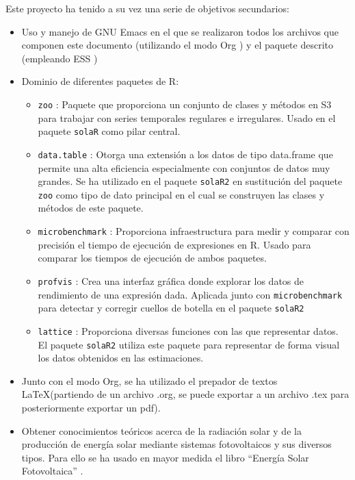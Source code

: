 Este proyecto ha tenido a su vez una serie de objetivos secundarios:
\begin{itemize}
\item Uso y manejo de GNU Emacs \cite{emacs85} en el que se realizaron todos los archivos que componen este documento (utilizando el modo Org \cite{dominik03}) y el paquete descrito (empleando ESS \cite{ess24})
\item Dominio de diferentes paquetes de R:
\begin{itemize}
\item \texttt{zoo} \cite{zeileis05}: Paquete que proporciona un conjunto de clases y métodos en S3 para trabajar con series temporales regulares e irregulares.
Usado en el paquete \texttt{solaR} como pilar central.
\item \texttt{data.table} \cite{barrett24}: Otorga una extensión a los datos de tipo data.frame que permite una alta eficiencia especialmente con conjuntos de datos muy grandes.
Se ha utilizado en el paquete \texttt{solaR2} en sustitución del paquete \texttt{zoo} como tipo de dato principal en el cual se construyen las clases y métodos de este paquete.
\item \texttt{microbenchmark} \cite{mersmann23}: Proporciona infraestructura para medir y comparar con precisión el tiempo de ejecución de expresiones en R.
Usado para comparar los tiempos de ejecución de ambos paquetes.
\item \texttt{profvis} \cite{wickham24}: Crea una interfaz gráfica donde explorar los datos de rendimiento de una expresión dada.
Aplicada junto con \texttt{microbenchmark} para detectar y corregir cuellos de botella en el paquete \texttt{solaR2}
\item \texttt{lattice} \cite{sarkar08}: Proporciona diversas funciones con las que representar datos.
El paquete \texttt{solaR2} utiliza este paquete para representar de forma visual los datos obtenidos en las estimaciones.
\end{itemize}
\item Junto con el modo Org, se ha utilizado el prepador de textos \LaTeX (partiendo de un archivo .org, se puede exportar a un archivo .tex para posteriormente exportar un pdf).
\item Obtener conocimientos teóricos acerca de la radiación solar y de la producción de energía solar mediante sistemas fotovoltaicos y sus diversos tipos.
Para ello se ha usado en mayor medida el libro ``Energía Solar Fotovoltaica'' \cite{Perpinan2023}.
\end{itemize}
